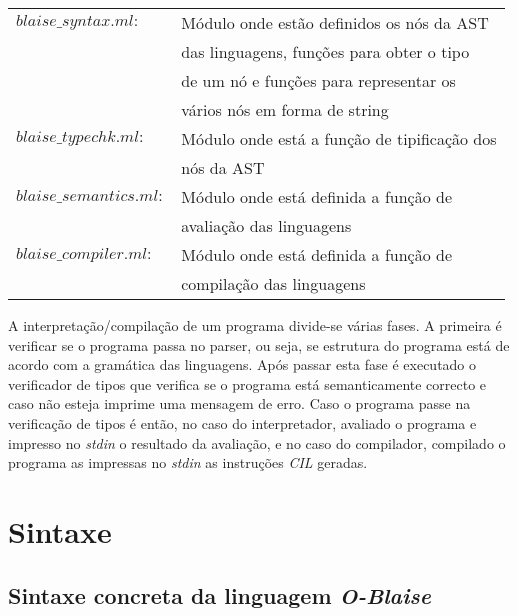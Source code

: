 \begin{tabular}{|l|l|}
\hline
$blaise\_syntax.ml:$ 	& Módulo onde estão definidos os nós da AST \\
						& das linguagens, funções para obter o tipo \\
						& de um nó e funções para representar os \\
						& vários nós em forma de string \\
\hline
$blaise\_typechk.ml:$	& Módulo onde está a função de tipificação dos \\
						& nós da AST \\
\hline
$blaise\_semantics.ml:$	& Módulo onde está definida a função de \\
						& avaliação das linguagens \\ 
\hline
$blaise\_compiler.ml:$	& Módulo onde está definida a função de \\
						& compilação das linguagens \\
\hline
\end{tabular}

\vspace{\baselineskip}
A interpretação/compilação de um programa divide-se várias fases. A primeira é verificar se o programa passa no parser, ou seja, se estrutura do programa está de acordo com a gramática das linguagens. Após passar esta fase é executado o verificador de tipos que verifica se o programa está semanticamente correcto e caso não esteja imprime uma mensagem de erro. Caso o programa passe na verificação de tipos é então, no caso do interpretador, avaliado o programa e impresso no \emph{stdin} o resultado da avaliação, e no caso do compilador, compilado o programa as impressas no \emph{stdin} as instruções \emph{CIL} geradas. 

\newpage
\section{Sintaxe}

\subsection{Sintaxe concreta da linguagem \emph{O-Blaise}}

